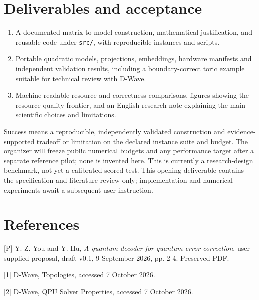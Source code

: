 \documentclass[11pt,letterpaper]{article}
\begin{document}
\clearpage

\section{Deliverables and acceptance}

\begin{enumerate}\item A documented matrix-to-model construction, mathematical justification, and reusable code under \texttt{src/}, with reproducible instances and scripts.
\item Portable quadratic models, projections, embeddings, hardware manifests and independent validation results, including a boundary-correct toric example suitable for technical review with D-Wave.
\item Machine-readable resource and correctness comparisons, figures showing the resource-quality frontier, and an English research note explaining the main scientific choices and limitations.\end{enumerate}

Success means a reproducible, independently validated construction and evidence-supported tradeoff or limitation on the declared instance suite and budget. The organizer will freeze public numerical budgets and any performance target after a separate reference pilot; none is invented here. This is currently a research-design benchmark, not yet a calibrated scored test. This opening deliverable contains the specification and literature review only; implementation and numerical experiments await a subsequent user instruction.\par

\section{References}

{\small [P] Y.-Z. You and Y. Hu, \emph{A quantum decoder for quantum error correction}, user-supplied proposal, draft v0.1, 9 September 2026, pp. 2-4. Preserved PDF.\par}\vspace{5pt}

{\small [1] D-Wave, \href{https://docs.dwavequantum.com/en/latest/quantum_research/topologies.html}{Topologies}, accessed 7 October 2026.\par}\vspace{5pt}

{\small [2] D-Wave, \href{https://docs.dwavequantum.com/en/latest/quantum_research/solver_properties_all.html}{QPU Solver Properties}, accessed 7 October 2026.\par}\vspace{5pt}
\end{document}
